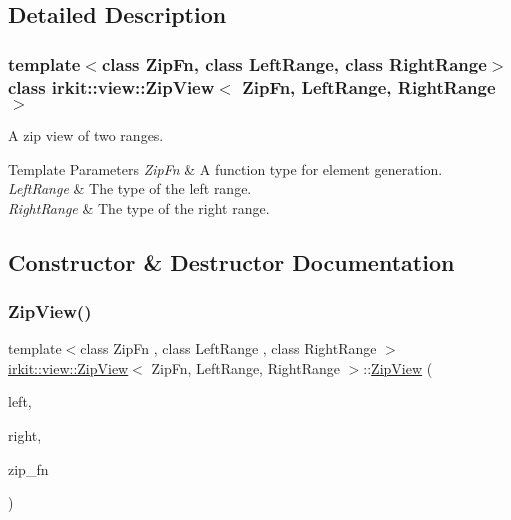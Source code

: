 \subsection{Detailed Description}
\subsubsection*{template$<$class Zip\+Fn, class Left\+Range, class Right\+Range$>$\newline
class irkit\+::view\+::\+Zip\+View$<$ Zip\+Fn, Left\+Range, Right\+Range $>$}

A zip view of two ranges. 


\begin{DoxyTemplParams}{Template Parameters}
{\em Zip\+Fn} & A function type for element generation. \\
\hline
{\em Left\+Range} & The type of the left range. \\
\hline
{\em Right\+Range} & The type of the right range. \\
\hline
\end{DoxyTemplParams}


\subsection{Constructor \& Destructor Documentation}
\mbox{\label{classirkit_1_1view_1_1ZipView_a581e90890462717bbdac0f02dc343641}} 
\subsubsection{\texorpdfstring{Zip\+View()}{ZipView()}}
{\footnotesize\ttfamily template$<$class Zip\+Fn , class Left\+Range , class Right\+Range $>$ \\
\hyperlink{classirkit_1_1view_1_1ZipView}{irkit\+::view\+::\+Zip\+View}$<$ Zip\+Fn, Left\+Range, Right\+Range $>$\+::\hyperlink{classirkit_1_1view_1_1ZipView}{Zip\+View} (\begin{DoxyParamCaption}\item[{const Left\+Range \&}]{left,  }\item[{const Right\+Range \&}]{right,  }\item[{Zip\+Fn}]{zip\+\_\+fn }\end{DoxyParamCaption})\hspace{0.3cm}{\ttfamily [inline]}}



